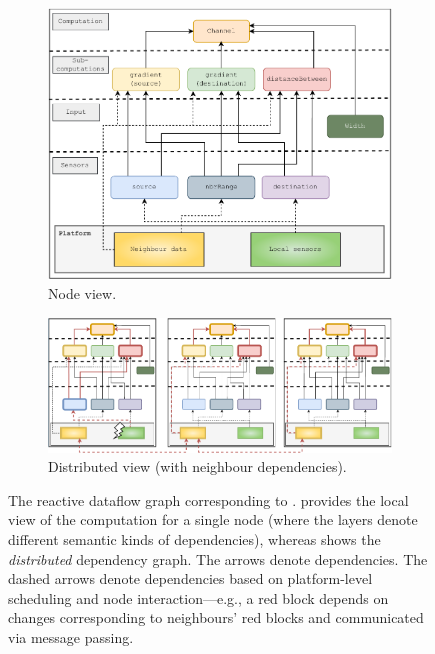 \begin{example}
\begin{figure}
  \centering%
  \begin{subfigure}[b]{0.5\columnwidth}
    \centering%
    \includegraphics[width=\columnwidth]{papers/acsos2023-frp/imgs/channel-graphical}
    \caption{Node view.}
    \label{acsos2023-frp:fig:channel-graphical}
  \end{subfigure}
  \begin{subfigure}[b]{\columnwidth}
    \centering%
    \includegraphics[width=\columnwidth]{papers/acsos2023-frp/imgs/interactions}
    \caption{Distributed view (with neighbour dependencies).}
    \label{acsos2023-frp:fig:interactions}
  \end{subfigure}
  \caption[The reactive dataflow graph corresponding to the channel example.]{
      The reactive dataflow graph corresponding to .
       provides the local view of the computation for a single node
      (where the layers denote different semantic kinds of dependencies),
      whereas  shows the \emph{distributed} dependency graph.
      The arrows denote dependencies.
      The dashed arrows denote dependencies based on platform-level scheduling and node interaction---e.g.,
      a red block depends on changes corresponding to neighbours' red blocks and communicated via message passing.
  }
  \label{acsos2023-frp:fig:channel:graph}
\end{figure}

\end{example}

